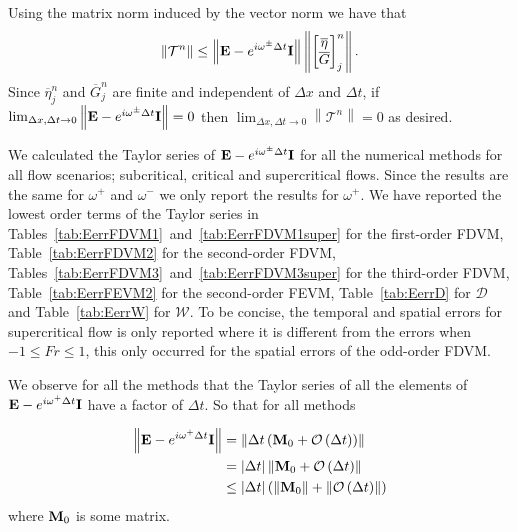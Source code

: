 Using the matrix norm induced by the vector norm we have that
\begin{equation}
\left \|\mathcal{T}^n \right \|  \le \left \| \mathbf{E} -  e^{i \omega^\pm \Delta t}\mathbf{I} \right \| \left \| \begin{bmatrix}
\overline{\eta} \\ \overline{G}
\end{bmatrix}^{n}_j\right \|.
\end{equation}
Since $\overline{\eta}^n_j$ and  $\overline{G}^n_j$ are finite and independent of $\Delta x$ and $\Delta t$, if $ \lim_{\Delta x,\Delta t \rightarrow 0} \left\| \mathbf{E} -  e^{i \omega^\pm \Delta t}\mathbf{I} \right\| = 0 $ then $ \lim_{\Delta x,\Delta t \rightarrow 0}\left \| \mathcal{T}^n \right \| = 0 $ as desired.

We calculated the Taylor series of $\mathbf{E} -  e^{i \omega^\pm \Delta t}\mathbf{I}$ for all the numerical methods for all flow scenarios; subcritical, critical and supercritical flows. Since the results are the same for $\omega^+$ and $\omega^-$ we only report the results for $\omega^+$. We have reported the lowest order terms of the Taylor series in Tables~\ref{tab:EerrFDVM1}~and~\ref{tab:EerrFDVM1super} for the first-order FDVM, Table~\ref{tab:EerrFDVM2} for the second-order FDVM, Tables~\ref{tab:EerrFDVM3}~and~\ref{tab:EerrFDVM3super} for the third-order FDVM,  Table~\ref{tab:EerrFEVM2} for the second-order FEVM, Table~\ref{tab:EerrD} for $\mathcal{D}$ and Table~\ref{tab:EerrW} for $\mathcal{W}$. To be concise, the temporal and spatial errors for supercritical flow is only reported where it is different from the errors when $-1 \le Fr \le 1$, this only occurred for the spatial errors of the odd-order FDVM. 

We observe for all the methods that the Taylor series of all the elements of $\mathbf{E} -  e^{i \omega^+ \Delta t}\mathbf{I}$ have a factor of $\Delta t$. So that for all methods 

\begin{align*}
\left \| \mathbf{E} -  e^{i \omega^+ \Delta t}\mathbf{I} \right \| &=  \left \| \Delta t \left(\mathbf{M}_0 +  \mathcal{O}\left(\Delta t\right)\right)\right \|  \nonumber\\ &= |\Delta t|  \left \| \mathbf{M}_0 +  \mathcal{O}\left(\Delta t\right)\right \|
 \nonumber\\ &\le  |\Delta t| \left(\left \| \mathbf{M}_0 \right \| + \left \| \mathcal{O}\left(\Delta t\right)\right \|\right)
\end{align*} 
where $\mathbf{M}_0$ is some matrix.

